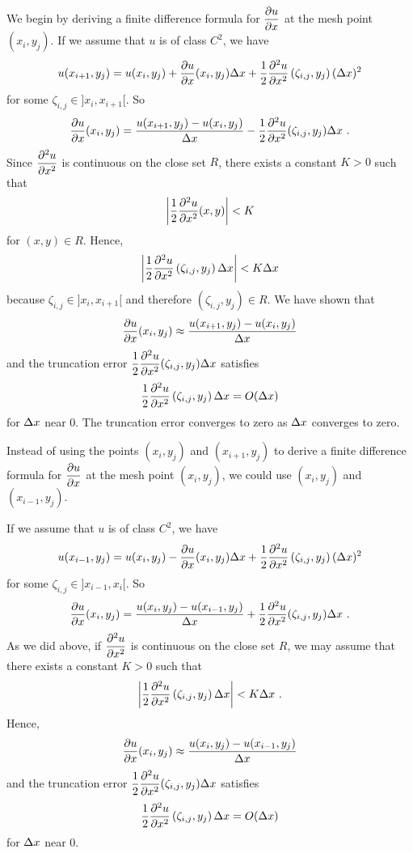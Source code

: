 We begin by deriving a finite difference formula for
$\displaystyle \frac{\partial{u}}{\partial{x}}$ at the mesh point $(x_i,y_j)$.
If we assume that $u$ is of class $C^2$, we have
\[
u(x_{i+1},y_j) = u(x_i,y_j) + \frac{\partial{u}}{\partial{x}}(x_i,y_j) \Delta{x}
+ \frac{1}{2} \frac{\partial^{2}{u}}{\partial{x}^{2}}\left(\zeta_{i,j},y_j\right) (\Delta{x})^2
\]
for some $\zeta_{i,j} \in ]x_i,x_{i+1}[$.  So
\begin{equation} \label{fdm_foD}
\frac{\partial{u}}{\partial{x}}(x_i,y_j) = \frac{u(x_{i+1},y_j)- u(x_i,y_j)}{\Delta{x}}
- \frac{1}{2} \frac{\partial^{2}{u}}{\partial{x}^{2}}(\zeta_{i,j},y_j) \Delta{x} \ .
\end{equation}
Since $\displaystyle \frac{\partial^{2}{u}}{\partial{x}^{2}}$ is continuous on the close set
$R$, there exists a constant $K >0$ such that 
\[
\left| \frac{1}{2} \frac{\partial^{2}{u}}{\partial{x}^{2}}(x,y) \right| < K
\]
for $(x,y) \in R$.  Hence,
\[
\left| \frac{1}{2} \frac{\partial^{2}{u}}{\partial{x}^{2}}\left(\zeta_{i,j},y_j\right) \Delta{x} \right|
< K \Delta{x}
\]
because $\zeta_{i,j} \in ]x_i,x_{i+1}[$ and therefore $(\zeta_{i,j},y_j) \in R$.
We have shown that
\begin{equation} \label{fdm_simple}
\frac{\partial{u}}{\partial{x}}(x_i,y_j) \approx \frac{u(x_{i+1},y_j)- u(x_i,y_j)}{\Delta{x}}
\end{equation}
and the truncation error
$\displaystyle \frac{1}{2} \frac{\partial^{2}{u}}{\partial{x}^{2}}(\zeta_{i,j},y_j) \Delta{x}$ satisfies
\[
\frac{1}{2} \frac{\partial^{2}{u}}{\partial{x}^{2}}\left(\zeta_{i,j},y_j\right) \Delta{x} = O(\Delta{x})
\]
for $\Delta{x}$ near $0$.  The truncation error converges to zero as
$\Delta{x}$ converges to zero.

Instead of using the points $(x_i,y_j)$ and $(x_{i+1},y_j)$ to
derive a finite difference formula for $\displaystyle \frac{\partial{u}}{\partial{x}}$ at
the mesh point $(x_i,y_j)$, we could use $(x_i,y_j)$ and
$(x_{i-1},y_j)$.

If we assume that $u$ is of class $C^2$, we have
\[
u(x_{i-1},y_j) = u(x_i,y_j) - \frac{\partial{u}}{\partial{x}}(x_i,y_j) \Delta{x}
+ \frac{1}{2} \frac{\partial^{2}{u}}{\partial{x}^{2}}\left(\zeta_{i,j},y_j\right) (\Delta{x})^2
\]
for some $\zeta_{i,j} \in ]x_{i-1},x_i[$.  So
\begin{equation} \label{fdm_foDM}
\frac{\partial{u}}{\partial{x}}(x_i,y_j) = \frac{u(x_i,y_j)- u(x_{i-1},y_j)}{\Delta{x}}
+ \frac{1}{2} \frac{\partial^{2}{u}}{\partial{x}^{2}}(\zeta_{i,j},y_j) \Delta{x} \ .
\end{equation}
As we did above, if $\displaystyle \frac{\partial^{2}{u}}{\partial{x}^{2}}$ is continuous on
the close set $R$, we may assume that there exists a constant $K >0$
such that
\[
\left| \frac{1}{2} \frac{\partial^{2}{u}}{\partial{x}^{2}}\left(\zeta_{i,j},y_j\right) \Delta{x} \right|
< K \Delta{x} \ .
\]
Hence,
\begin{equation} \label{fdm_simpleM}
\frac{\partial{u}}{\partial{x}}(x_i,y_j) \approx \frac{u(x_i,y_j)- u(x_{i-1},y_j)}{\Delta{x}}
\end{equation}
and the truncation error
$\displaystyle \frac{1}{2} \frac{\partial^{2}{u}}{\partial{x}^{2}}(\zeta_{i,j},y_j) \Delta{x}$ satisfies
\[
\frac{1}{2} \frac{\partial^{2}{u}}{\partial{x}^{2}}\left(\zeta_{i,j},y_j\right) \Delta{x} = O(\Delta{x})
\]
for $\Delta{x}$ near $0$.

